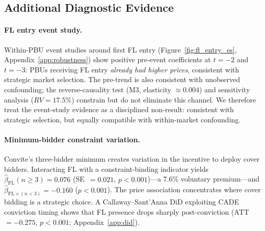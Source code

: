 
\subsection{Additional Diagnostic Evidence}
\label{sec:additional_id}

\paragraph{FL entry event study.}
Within-PBU event studies around first FL entry
(Figure~\ref{fig:fl_entry_es}, Appendix~\ref{app:robustness}) show
positive pre-event coefficients at $t = -2$ and $t = -3$: PBUs
receiving FL entry \emph{already had higher prices}, consistent with
strategic market selection. The pre-trend is also consistent with
unobserved confounding; the reverse-causality test (M3, elasticity
$\approx 0.004$) and sensitivity analysis ($RV = 17.5\%$) constrain
but do not eliminate this channel. We therefore treat the event-study
evidence as a disciplined non-result: consistent with strategic
selection, but equally compatible with within-market confounding.

\paragraph{Minimum-bidder constraint variation.}
Convite's three-bidder minimum creates variation in the incentive to
deploy cover bidders. Interacting FL with a constraint-binding
indicator yields $\hat{\beta}_{\text{FL}}(n \geq 3) = 0.076$
(SE~$= 0.021$, $p < 0.001$)---a 7.6\% voluntary premium---and
$\hat{\beta}_{\text{FL} \times (n<3)} = -0.160$ ($p < 0.001$). The
price association concentrates where cover bidding is a strategic
choice. A Callaway--Sant'Anna DiD exploiting CADE conviction timing
shows that FL presence drops sharply post-conviction (ATT~$= -0.275$,
$p < 0.001$; Appendix~\ref{app:did}).
